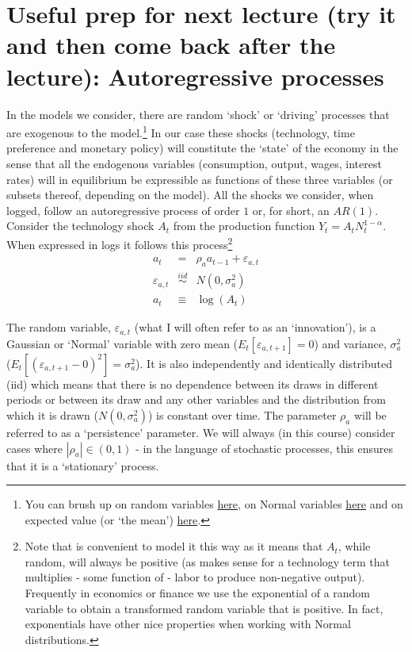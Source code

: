 \documentclass[authoryear,11pt]{elsarticle}
\begin{document}
\section{Useful prep for next lecture (try it and then come back after the lecture): Autoregressive processes}
In the models we consider, there are random `shock' or `driving' processes that are exogenous to the model.\footnote{You can brush up on random variables \href{https://en.wikipedia.org/wiki/Random_variable}{here}, on Normal variables \href{https://en.wikipedia.org/wiki/Normal_distribution}{here} and on expected value (or `the mean') \href{https://en.wikipedia.org/wiki/Expected_value}{here}.} In our case these shocks (technology, time preference and monetary policy) will constitute the `state' of the economy in the sense that all the endogenous variables (consumption, output, wages, interest rates) will in equilibrium be expressible as functions of these three variables (or subsets thereof, depending on the model). All the shocks we consider, when logged, follow an autoregressive process of order $1$ or, for short, an $AR(1)$. Consider the technology shock $A_{t}$ from the production function $Y_{t} = A_{t}N_{t}^{1-\alpha}$. When expressed in logs it follows this process\footnote{Note that is convenient to model it this way as it means that $A_{t}$, while random, will always be positive (as makes sense for a technology term that multiplies - some function of - labor to produce non-negative output). Frequently in economics or finance we use the exponential of a random variable to obtain a transformed random variable that is positive. In fact, exponentials have other nice properties when working with Normal distributions.}
\begin{eqnarray}
a_{t} 			&=& \rho_{a} a_{t-1} + \varepsilon_{a,t} 	\label{eqn:ar1} \\
\varepsilon_{a,t} &\overset{iid}{\sim}& N(0,\sigma^{2}_{a})	\nonumber \\
a_{t}			&\equiv& \log{(A_{t})} \nonumber
\end{eqnarray}

The random variable, $\varepsilon_{a,t}$  (what I will often refer to as an `innovation'), is a Gaussian or `Normal' variable with zero mean ($E_{t}[\varepsilon_{a,t+1}] = 0$) and variance, $\sigma^{2}_{a}$ ($E_{t}[(\varepsilon_{a,t+1} - 0)^{2}] = \sigma^{2}_{a}$). It is also independently and identically distributed (iid) which means that there is no dependence between its draws in different periods or between its draw and any other variables and the distribution from which it is drawn ($N(0,\sigma^{2}_{a})$) is constant over time. The parameter $\rho_{a}$ will be referred to as a `persistence' parameter. We will always (in this course) consider cases where $|\rho_{a}| \in (0,1)$ - in the language of stochastic processes, this ensures that it is a `stationary' process.
\end{document}
